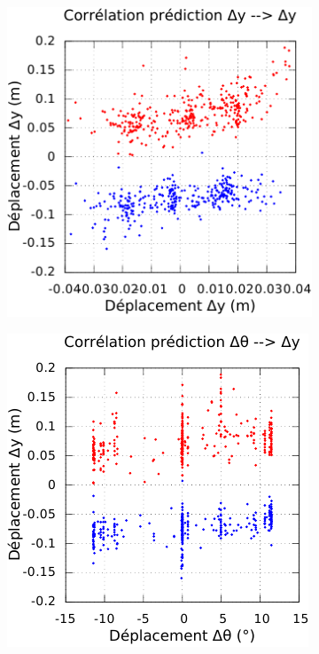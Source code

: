 \begin{figure}[htbp]
\begin{subfigure}{0.22\paperwidth}
    \end{subfigure}
    \begin{subfigure}{0.22\paperwidth}
        \centering
        \includegraphics[type=pdf,ext=.pdf,read=.pdf,width=1.0\linewidth]{../plot/OdometryLWPR/grass_close_function_goal_y_y}
    \end{subfigure}
    \begin{subfigure}{0.22\paperwidth}
        \centering
        \includegraphics[type=pdf,ext=.pdf,read=.pdf,width=1.0\linewidth]{../plot/OdometryLWPR/grass_close_function_goal_yaw_y}

\end{subfigure}
\end{figure}
